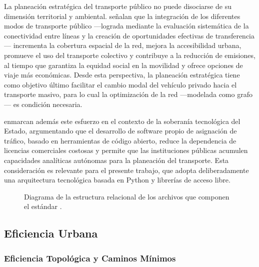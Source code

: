 La planeación estratégica del transporte público no puede disociarse de su dimensión
territorial y ambiental. \textcite{ugur2025} señalan que la integración de los
diferentes modos de transporte público ---lograda mediante la evaluación sistemática
de la conectividad entre líneas y la creación de oportunidades efectivas de
transferencia--- incrementa la cobertura espacial de la red, mejora la accesibilidad
urbana, promueve el uso del transporte colectivo y contribuye a la reducción de
emisiones, al tiempo que garantiza la equidad social en la movilidad y ofrece opciones
de viaje más económicas. Desde esta perspectiva, la planeación estratégica tiene
como objetivo último facilitar el cambio modal del vehículo privado hacia el transporte
masivo, para lo cual la optimización de la red ---modelada como grafo--- es condición
necesaria.

\textcite{moreno2023} enmarcan además este esfuerzo en el contexto de la soberanía
tecnológica del Estado, argumentando que el desarrollo de software propio de
asignación de tráfico, basado en herramientas de código abierto, reduce la
dependencia de licencias comerciales costosas y permite que las instituciones
públicas acumulen capacidades analíticas autónomas para la planeación del
transporte. Esta consideración es relevante para el presente trabajo, que adopta
deliberadamente una arquitectura tecnológica basada en Python y librerías de
acceso libre.

\begin{figure}[H]
   \centering
   \caption[Estructura relacional de archivos \gtfs{}]{Diagrama de la estructura
   relacional de los archivos que componen el estándar \gtfs{}.}
   \label{fig:gtfs-estructura}
 \end{figure}

\subsection{Eficiencia Urbana}
\label{subsec:eficiencia-urbana}

\subsubsection{Eficiencia Topológica y Caminos Mínimos}
\label{subsubsec:eficiencia-topologica}

